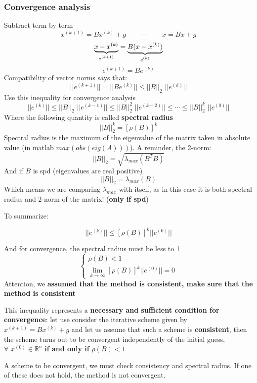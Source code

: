     \subsubsection{Convergence analysis}
    Subtract term by term
    $$
    x^{(k+1)}=Bx^{(k)}+g\qquad -\qquad x=Bx+g
    $$
    $$
    \underlabel{x-x^{(k)}}{$e^{(k+1)}$}=\underlabel{B(x-x^{(k)})}{$e^{(k)}$}
    $$
    $$
    e^{(k+1)}=Be^{(k)}
    $$
    Compatibility of vector norms says that:
    $$
    ||e^{(k+1)}||=||Be^{(k)}||\leq ||B||_2\,\,||e^{(k)}||
    $$
    Use this inequality for convergence analysis
    $$
    ||e^{(k)}||\leq ||B||_2\,\,||e^{(k-1)}||
    \leq
    ||B||_2^2\,\,||e^{(k-2)}||
    \leq
    \cdots
    \leq
    ||B||_2^k\,\,||e^{(0)}||
    $$
    Where the following quantity is called \textbf{spectral radius}
    $$
    ||B||_2^k=[\rho(B)]^k
    $$
    Spectral radius is the maximum of the eigenvalue of the matrix taken in absolute value (in matlab $max(abs(eig(A)))$). A reminder, the 2-norm:
    $$
    ||B||_2=\sqrt{\lambda_{max}(B^TB)}
    $$
    And if $B$ is spd (eigenvalues are real positive)
    $$||B||_2=\lambda_{max}(B)$$
    Which means we are comparing $\lambda_{max}$ with itself, as in this case it is both spectral radius and 2-norm of the matrix! (\textbf{only if spd})

    To summarize:
    \begin{LARGE}
        $$
        ||e^{(k)}||\leq\left[\rho(B)\right]^k||e^{(0)}||
        $$
    \end{LARGE}
    And for convergence, the spectral radius must be less to 1
    $$
    \begin{cases}
        \rho(B)<1\\
        \lim_{k\rightarrow\infty}\left[\rho(B)\right]^k||e^{(0)}||=0
    \end{cases}
    $$
    Attention, we \textbf{assumed that the method is consistent, make sure that the method is consistent}

    This inequality represents a \textbf{necessary and sufficient condition for convergence}: let use consider the iterative scheme given by $x^{(k+1)}=Bx^{(k)}+g$ and let us assume that such a scheme is \textbf{consistent}, then the scheme turns out to be convergent independently of the initial guess, $\forall\,\,x^{(0)}\in\mathbb{R}^n$ \textbf{if and only if} $\rho(B)<1$

    A scheme to be convergent, we must check consistency and spectral radius. If one of these does not hold, the method is not convergent.

